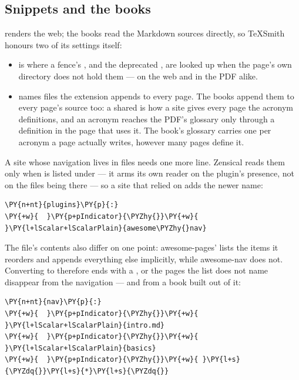 \documentclass[a4paper,twoside]{article}
\begin{document}
\subsection{Snippets and the books}
 renders the web; the books read the Markdown sources
directly, so TeXSmith honours two of its settings itself:
\begin{itemize}
\item {} is where a fence's , and the deprecated , are
looked up when the page's own directory does not hold them --- on the web and
in the PDF alike.
\item {} names files the extension appends to every page. The books
append them to every page's source too: a shared 
is how a site gives every page the acronym definitions, and an acronym
reaches the PDF's glossary only through a definition in the page that uses
it. The book's glossary carries one  per acronym a page
actually writes, however many pages define it.
\end{itemize}
A site whose navigation lives in  files needs one more line. Zensical
reads them only when  is listed under  --- it arms its own
reader on the plugin's presence, not on the files being there --- so a site that
relied on  adds the newer name:
\begin{tscode}[lang=yaml, engine=pygments]
\begin{Verbatim}[commandchars=\\\{\},breaklines, breakanywhere, commandchars=\\\{\}]
\PY{n+nt}{plugins}\PY{p}{:}
\PY{+w}{  }\PY{p+pIndicator}{\PYZhy{}}\PY{+w}{ }\PY{l+lScalar+lScalarPlain}{awesome\PYZhy{}nav}
\end{Verbatim}
\end{tscode}
The file's contents also differ on one point: awesome-pages'  lists
the items it reorders and appends everything else implicitly, while awesome-nav
does not. Converting  to  therefore ends with a , or the
pages the list does not name disappear from the navigation --- and from a book
built out of it:
\begin{tscode}[lang=yaml, engine=pygments]
\begin{Verbatim}[commandchars=\\\{\},breaklines, breakanywhere, commandchars=\\\{\}]
\PY{n+nt}{nav}\PY{p}{:}
\PY{+w}{  }\PY{p+pIndicator}{\PYZhy{}}\PY{+w}{ }\PY{l+lScalar+lScalarPlain}{intro.md}
\PY{+w}{  }\PY{p+pIndicator}{\PYZhy{}}\PY{+w}{ }\PY{l+lScalar+lScalarPlain}{basics}
\PY{+w}{  }\PY{p+pIndicator}{\PYZhy{}}\PY{+w}{ }\PY{l+s}{\PYZdq{}}\PY{l+s}{*}\PY{l+s}{\PYZdq{}}
\end{Verbatim}
\end{tscode}
\end{document}
